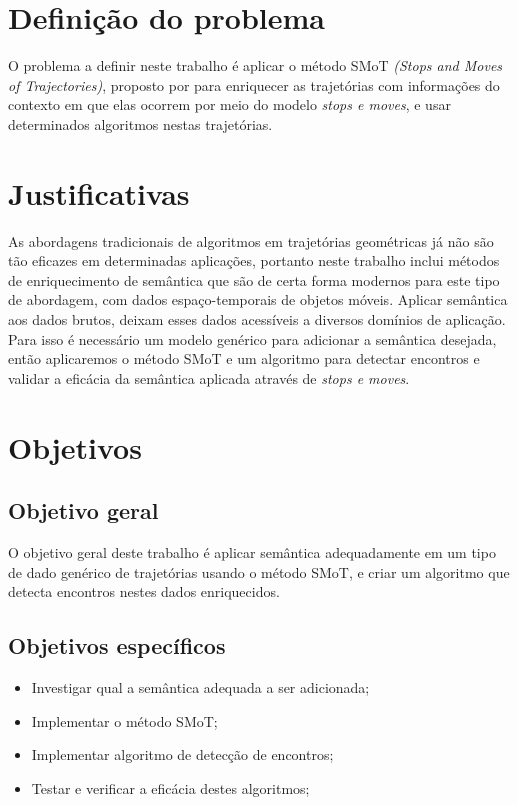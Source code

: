 \documentclass[	12pt, Times, openright, twoside, a4paper, english, brazil]{abntex2}
\begin{document}
\section{Definição do problema}
O problema a definir neste trabalho é aplicar o método SMoT \textit{(Stops and Moves of Trajectories)}, proposto por \cite{alvares2007} para enriquecer as trajetórias com informações do contexto em que elas ocorrem por meio do modelo \textit{stops e moves}, e usar determinados algoritmos nestas trajetórias.

\section{Justificativas}
As abordagens tradicionais de algoritmos em trajetórias geométricas já não são tão eficazes em determinadas aplicações, portanto neste trabalho inclui métodos de enriquecimento de semântica que são de certa forma modernos para este tipo de abordagem, com dados espaço-temporais de objetos móveis. Aplicar semântica aos dados brutos, deixam esses dados acessíveis a diversos domínios de aplicação. Para isso é necessário um modelo genérico para adicionar a semântica desejada, então aplicaremos o método SMoT e um algoritmo para detectar encontros e validar a eficácia da semântica aplicada através de \textit{stops e moves}.

\section{Objetivos}
\subsection{Objetivo geral}
O objetivo geral deste trabalho é aplicar semântica adequadamente em um tipo de dado genérico de trajetórias usando o método SMoT, e criar um algoritmo que detecta encontros nestes dados enriquecidos.
\subsection{Objetivos específicos}
\begin{itemize}
\item Investigar qual a semântica adequada a ser adicionada; 
\item Implementar o método SMoT;
\item Implementar algoritmo de detecção de encontros;
\item Testar e verificar a eficácia destes algoritmos;
\end{itemize}
\end{document}
